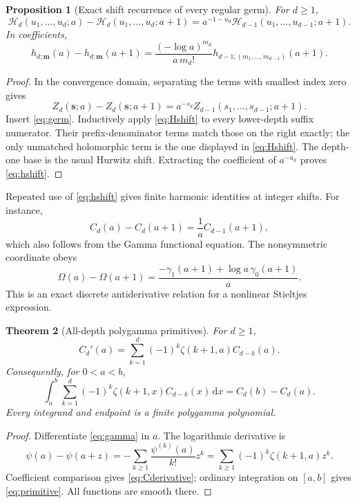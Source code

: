 \documentclass[11pt,a4paper]{article}
\numberwithin{equation}{section}
\newtheorem{theorem}{Theorem}[section]
\newtheorem{proposition}[theorem]{Proposition}
\theoremstyle{definition}\newtheorem{definition}[theorem]{Definition}
\theoremstyle{remark}\newtheorem{remark}[theorem]{Remark}
\newcommand{\HH}{\mathcal H}
\newcommand{\dd}{\,\mathrm d}
\begin{document}
\begin{proposition}[Exact shift recurrence of every regular germ]
\label{prop:shift}
For $d\ge1$,
\begin{equation}\label{eq:Hshift}
 \boxed{\displaystyle
 \HH_d(u_1,\ldots,u_d;a)-\HH_d(u_1,\ldots,u_d;a+1)
  =a^{-1-u_d}\HH_{d-1}(u_1,\ldots,u_{d-1};a+1).}
\end{equation}
In coefficients,
\begin{equation}\label{eq:hshift}
 h_{d;\bm m}(a)-h_{d;\bm m}(a+1)
 =\frac{(-\log a)^{m_d}}{a\,m_d!}
          h_{d-1;(m_1,\ldots,m_{d-1})}(a+1).
\end{equation}
\end{proposition}
\begin{proof}
In the convergence domain, separating the terms with smallest index zero
gives
\[
 Z_d(\bm s;a)-Z_d(\bm s;a+1)
          =a^{-s_d}Z_{d-1}(s_1,\ldots,s_{d-1};a+1).
\]
Insert \eqref{eq:germ}. Inductively apply \eqref{eq:Hshift} to every
lower-depth suffix numerator. Their prefix-denominator terms match
those on the right exactly; the only unmatched holomorphic term is the
one displayed in \eqref{eq:Hshift}. The depth-one base is the usual
Hurwitz shift. Extracting the coefficient of $a^{-u_d}$ proves
\eqref{eq:hshift}.
\end{proof}

Repeated use of \eqref{eq:hshift} gives finite harmonic identities at
integer shifts. For instance,
\begin{equation}\label{eq:Cshift}
 C_d(a)-C_d(a+1)=\frac1a C_{d-1}(a+1),
\end{equation}
which also follows from the Gamma functional equation. The nonsymmetric
coordinate obeys
\begin{equation}\label{eq:Omegashift}
 \Omega(a)-\Omega(a+1)
   =\frac{-\gamma_1(a+1)+\log a\,\gamma_0(a+1)}a.
\end{equation}
This is an exact discrete antiderivative relation for a nonlinear
Stieltjes expression.

\begin{theorem}[All-depth polygamma primitives]\label{thm:primitive}
For $d\ge1$,
\begin{equation}\label{eq:Cderivative}
 C_d'(a)=\sum_{k=1}^{d}(-1)^k\zeta(k+1,a)C_{d-k}(a).
\end{equation}
Consequently, for $0<a<b$,
\begin{equation}\label{eq:primitive}
 \boxed{\displaystyle
 \int_a^b\sum_{k=1}^{d}(-1)^k\zeta(k+1,x)C_{d-k}(x)\dd x
                       =C_d(b)-C_d(a).}
\end{equation}
Every integrand and endpoint is a finite polygamma polynomial.
\end{theorem}
\begin{proof}
Differentiate \eqref{eq:gamma} in $a$. The logarithmic derivative is
\[
 \psi(a)-\psi(a+z)
 =-\sum_{k\ge1}\frac{\psi^{(k)}(a)}{k!}z^k
 =\sum_{k\ge1}(-1)^k\zeta(k+1,a)z^k.
\]
Coefficient comparison gives \eqref{eq:Cderivative}; ordinary integration
on $[a,b]$ gives \eqref{eq:primitive}. All functions are smooth there.
\end{proof}
\end{document}
